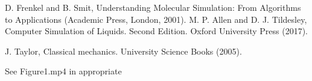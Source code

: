 \documentclass[twocolumn,preprintnumbers,amsmath,amssymb,aps,prx]{revtex4}
\begin{document}
\begin{thebibliography}{99}

     D. Frenkel and B. Smit, Understanding Molecular Simulation: From Algorithms to Applications (Academic Press, London, 2001).
     M. P. Allen and D. J. Tildesley, Computer Simulation of Liquids.  Second Edition. Oxford University Press (2017).

     J. Taylor,  Classical mechanics. University Science Books (2005).
      
 See Figure1.mp4 in appropriate %













\end{thebibliography}
\end{document}

